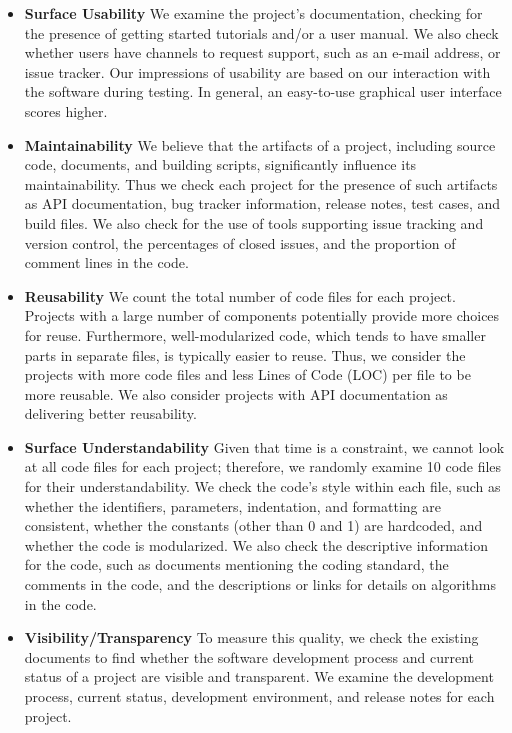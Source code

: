 \documentclass[final, 3p, times, authoryear]{elsarticle}
\begin{document}
\begin{itemize}
\item \textbf{Surface Usability} We examine the project's documentation,
checking for the presence of getting started tutorials and/or a user manual. We
also check whether users have channels to request support, such as an e-mail
address, or issue tracker. Our impressions of usability are based on our
interaction with the software during testing.  In general, an easy-to-use
graphical user interface scores higher.

\item \textbf{Maintainability} We believe that the artifacts of a project,
including source code, documents, and building scripts, significantly influence
its maintainability. Thus we check each project for the presence of such
artifacts as API documentation, bug tracker information, release notes, test
cases, and build files. We also check for the use of tools supporting issue
tracking and version control, the percentages of closed issues, and the
proportion of comment lines in the code.

\item \textbf{Reusability} We count the total number of code files for each
project. Projects with a large number of components potentially provide more
choices for reuse. Furthermore, well-modularized code, which tends to have
smaller parts in separate files, is typically easier to reuse. Thus, we consider
the projects with more code files and less Lines of Code (LOC) per file to be
more reusable. We also consider projects with API documentation as delivering
better reusability.

\item \textbf{Surface Understandability} Given that time is a constraint, we
cannot look at all code files for each project; therefore, we randomly examine
10 code files for their understandability. We check the code’s style within each
file, such as whether the identifiers, parameters, indentation, and formatting
are consistent, whether the constants (other than 0 and 1) are hardcoded, and
whether the code is modularized. We also check the descriptive information for
the code, such as documents mentioning the coding standard, the comments in the
code, and the descriptions or links for details on algorithms in the code. 

\item \textbf{Visibility/Transparency} To measure this quality, we check the
existing documents to find whether the software development process and
current status of a project are visible and transparent. We examine the
development process, current status, development environment, and release notes
for each project.
\end{itemize}
\end{document}

